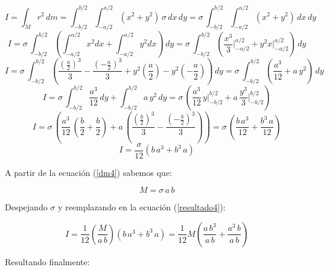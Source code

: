 \documentclass[letter,oneside,11pt]{article}
\begin{document}
\begin{equation*}
    I = \int_{M} r^2\, dm = \int_{-b/2}^{b/2} \int_{-a/2}^{a/2} (x^2 + y^2)\, \sigma\, dx\, dy = \sigma\, \int_{-b/2}^{b/2} \int_{-a/2}^{a/2} (x^2 + y^2)\, dx \, dy
\end{equation*}
\begin{equation*}
    I = \sigma\, \int_{-b/2}^{b/2} \left( \int_{-a/2}^{a/2} x^2 dx + \int_{-a/2}^{a/2} y^2 dx \right) \, dy = \sigma\, \int_{-b/2}^{b/2} \left( \frac{x^3}{3} \Biggr|_{-a/2}^{a/2} + y^2 x \Biggr|_{-a/2}^{a/2} \right) \, dy
\end{equation*}
\begin{equation*}
    I = \sigma\, \int_{-b/2}^{b/2} \left( \frac{(\frac{a}{2})^3}{3} - \frac{(-\frac{a}{2})^3}{3} + y^2 \left( \frac{a}{2}\right) - y^2 \left( -\frac{a}{2}\right) \right) \, dy = \sigma\, \int_{-b/2}^{b/2} \left( \frac{a^3}{12} + a\, y^2  \right) \, dy
\end{equation*}
\begin{equation*}
    I = \sigma\, \int_{-b/2}^{b/2} \frac{a^3}{12}\, dy + \int_{-b/2}^{b/2} a\, y^2\, dy = \sigma\, \left( \frac{a^3}{12}\, y \Biggr|_{-b/2}^{b/2} + a\, \frac{y^3}{3} \Biggr|_{-b/2}^{b/2} \right)
\end{equation*}
\begin{equation*}
    I = \sigma\, \left( \frac{a^3}{12}\, \left( \frac{b}{2} + \frac{b}{2} \right) + a\, \left( \frac{(\frac{b}{2})^3}{3} - \frac{(-\frac{b}{2})^3}{3} \right) \right) = \sigma\, \left( \frac{b\, a^3}{12} + \frac{b^3\, a}{12} \right)
\end{equation*}
\begin{equation}
    I = \frac{\sigma}{12} (b\, a^3 + b^3\, a)
\label{resultado4}
\end{equation}

A partir de la ecuación (\ref{dm4}) sabemos que:

\begin{equation*}
    M = \sigma\, a\, b
\end{equation*}

Despejando $\sigma$ y reemplazando en la ecuación (\ref{resultado4}):

\begin{equation*}
    I = \frac{1}{12} \left( \frac{M}{a\, b} \right) (b\, a^3 + b^3\, a) = \frac{1}{12} M \left( \frac{a\, b^3}{a\, b} + \frac{a^3\, b}{a\, b} \right)
\end{equation*}

Resultando finalmente:
\end{document}
